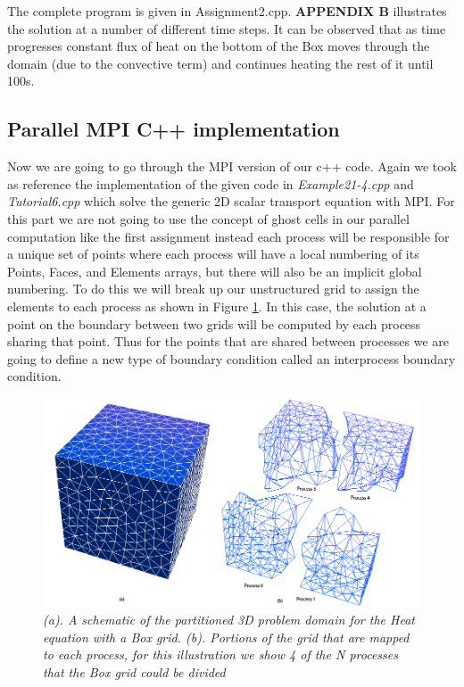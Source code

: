 \documentclass[12pt]{article}
\begin{document}
The complete program is given in Assignment2.cpp. \textbf{APPENDIX B} illustrates the solution at a number of different time steps. It can be observed that as time progresses constant flux of heat on the bottom of the Box moves through
the domain (due to the convective term) and continues heating the rest of it until 100s.

\subsection{Parallel MPI C++ implementation}
Now we are going to go through the MPI version of our c++ code. Again we took as reference the implementation of the given code in \textit{Example21-4.cpp} and \textit{Tutorial6.cpp} which solve the generic 2D scalar transport equation with MPI. For this part we are not going to use the concept of ghost cells in our parallel computation like the first assignment instead each process will be responsible for a unique set of points where each process will have a local numbering of its Points, Faces, and Elements arrays, but there will also be an implicit global numbering. To do this we will break up our unstructured grid to assign the elements to each process as shown in Figure \ref{fig:boxpartition}. In this case, the solution at a point on the boundary between two grids will be computed by each process sharing that point. Thus for the points that are shared between processes we are going to define a new type of boundary condition called an interprocess boundary condition.

	\begin{figure}[H]
    \includegraphics[scale=0.5]{Box.png}
    \centering
    \caption{\textit{(a). A schematic of the partitioned 3D problem domain for the Heat equation with a Box grid. (b). Portions of the grid that are mapped to each process, for this illustration we show 4 of the N processes that the Box grid could be divided}}
    \label{fig:boxpartition}
	\end{figure}	
\end{document}
